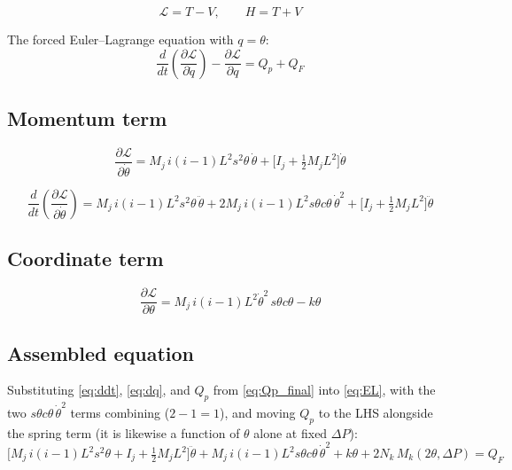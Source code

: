 \documentclass[11pt]{article}
\newcommand{\st}{s\theta}
\newcommand{\ct}{c\theta}
\newcommand{\dth}{\dot{\theta}}
\newcommand{\ddth}{\ddot{\theta}}
\newcommand{\DP}{\Delta P}
\newcommand{\Mk}{M_k}
\begin{document}
\begin{equation}
\mathcal{L} = T - V,
\qquad
H = T + V
\end{equation}

The forced Euler--Lagrange equation with $q=\theta$:
\begin{equation}
\frac{d}{dt}\!\left(\frac{\partial \mathcal{L}}{\partial \dot{q}}\right)
- \frac{\partial \mathcal{L}}{\partial q}
= Q_p + Q_F
\label{eq:EL}
\end{equation}

\subsection*{Momentum term}

\begin{equation}
\frac{\partial \mathcal{L}}{\partial \dth}
= M_j\,i(i-1)L^{2}s^{2}\theta\,\dth
+ \Big[I_j + \tfrac{1}{2}M_j L^{2}\Big]\dth
\end{equation}

\begin{equation}
\frac{d}{dt}\!\left(\frac{\partial \mathcal{L}}{\partial \dth}\right)
= M_j\,i(i-1)L^{2}s^{2}\theta\,\ddth
+ 2M_j\,i(i-1)L^{2}\st\ct\,\dth^{2}
+ \Big[I_j + \tfrac{1}{2}M_j L^{2}\Big]\ddth
\label{eq:ddt}
\end{equation}

\subsection*{Coordinate term}

\begin{equation}
\frac{\partial \mathcal{L}}{\partial \theta}
= M_j\,i(i-1)L^{2}\dth^{2}\,\st\ct - k\theta
\label{eq:dq}
\end{equation}

\subsection*{Assembled equation}

Substituting \eqref{eq:ddt}, \eqref{eq:dq}, and $Q_p$ from \eqref{eq:Qp_final} into \eqref{eq:EL},
with the two $\st\ct\,\dth^2$ terms combining ($2-1=1$), and moving $Q_p$ to the LHS alongside the
spring term (it is likewise a function of $\theta$ alone at fixed $\DP$):
\begin{equation}
\boxed{
\Big[M_j\,i(i-1)L^{2}s^{2}\theta + I_j + \tfrac{1}{2}M_j L^{2}\Big]\ddth
+ M_j\,i(i-1)L^{2}\st\ct\,\dth^{2}
+ k\theta
+ 2N_k\,\Mk(2\theta,\DP)
= Q_F
}
\end{equation}
\end{document}
